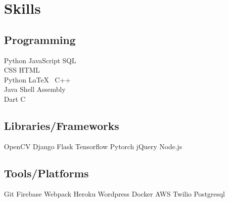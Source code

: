 \documentclass[]{plushcv}
\begin{document}
\begin{minipage}[t]{0.70\textwidth}
%
%

\end{minipage} 
\hfill
\begin{minipage}[t]{0.25\textwidth} 


\section{Skills}
\subsection{Programming}
\sectionsep
{}
Python \textbullet{} JavaScript \textbullet{} SQL \textbullet{} \\ CSS \textbullet{} HTML \textbullet{} \\
\sectionsep
{}
Python \textbullet{} \LaTeX\ \textbullet{}  C++  \\
\sectionsep
{}
Java \textbullet{}  Shell \textbullet{} Assembly \\
Dart \textbullet{} C
\sectionsep
\sectionsep
\subsection{Libraries/Frameworks}
\sectionsep
 OpenCV \textbullet{} Django \textbullet{} Flask \textbullet{} Tensorflow \textbullet{} Pytorch \textbullet{}
jQuery \textbullet{} Node.js \textbullet{} \\
\sectionsep
\sectionsep
\subsection{Tools/Platforms}
\sectionsep
Git \textbullet{} Firebase \textbullet{} Webpack \textbullet{} Heroku  \textbullet{} Wordpress \textbullet{} Docker
\textbullet{} AWS \textbullet{} Twilio \textbullet{} Postgresql\\


\end{minipage}
\end{document}
